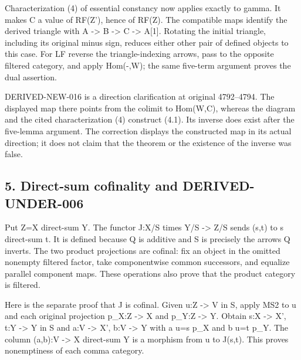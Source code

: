 Characterization (4)\allowbreak{} of essential constancy now applies exactly to gamma. It makes C a value of RF(Z')\allowbreak{},\allowbreak{} hence of RF(Z)\allowbreak{}. The compatible maps identify the derived triangle with A \allowbreak{}-> B \allowbreak{}-> C \allowbreak{}-> A[1]\allowbreak{}. Rotating the initial triangle,\allowbreak{} including its original minus sign,\allowbreak{} reduces either other pair of defined objects to this case. For LF reverse the triangle-indexing arrows,\allowbreak{} pass to the opposite filtered category,\allowbreak{} and apply Hom(-,\allowbreak{}W)\allowbreak{}; the same five-term argument proves the dual assertion.

DERIVED-NEW-016 is a direction clarification at original 4792–\allowbreak{}4794. The displayed map there points from the colimit to Hom(W,\allowbreak{}C)\allowbreak{},\allowbreak{} whereas the diagram and the cited characterization (4)\allowbreak{} construct (4.1)\allowbreak{}. Its inverse does exist after the five-lemma argument. The correction displays the constructed map in its actual direction; it does not claim that the theorem or the existence of the inverse was false.

\subsection{5. Direct-sum cofinality and DERIVED-UNDER-006}\label{proofs-4166-5089-direct-sum-cofinality-and-derived-under-006}

Put Z\allowbreak{}=X direct-sum Y. The functor J:\allowbreak{}X/\allowbreak{}S times Y/\allowbreak{}S \allowbreak{}-> Z/\allowbreak{}S sends (s,\allowbreak{}t)\allowbreak{} to s direct-sum t. It is defined because Q is additive and S is precisely the arrows Q inverts. The two product projections are cofinal:\allowbreak{} fix an object in the omitted nonempty filtered factor,\allowbreak{} take componentwise common successors,\allowbreak{} and equalize parallel component maps. These operations also prove that the product category is filtered.

Here is the separate proof that J is cofinal. Given u:\allowbreak{}Z \allowbreak{}-> V in S,\allowbreak{} apply MS2 to u and each original projection p\_\allowbreak{}X:\allowbreak{}Z \allowbreak{}-> X and p\_\allowbreak{}Y:\allowbreak{}Z \allowbreak{}-> Y. Obtain s:\allowbreak{}X \allowbreak{}-> X',\allowbreak{} t:\allowbreak{}Y \allowbreak{}-> Y\textquotesingle{} in S and a:\allowbreak{}V \allowbreak{}-> X',\allowbreak{} b:\allowbreak{}V \allowbreak{}-> Y\textquotesingle{} with a u\allowbreak{}=s p\_\allowbreak{}X and b u\allowbreak{}=t p\_\allowbreak{}Y. The column (a,\allowbreak{}b)\allowbreak{}:\allowbreak{}V \allowbreak{}-> X\textquotesingle{} direct-sum Y\textquotesingle{} is a morphism from u to J(s,\allowbreak{}t)\allowbreak{}. This proves nonemptiness of each comma category.

